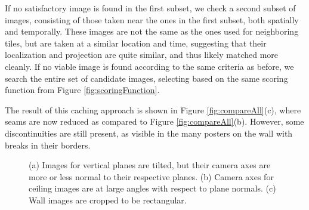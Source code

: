 \documentclass[]{spie}  %
\begin{document}
{If no satisfactory image is found in the first subset, we check a
second subset of images, consisting of those taken near the ones in
the first subset, both spatially and temporally. These images are not
the same as the ones used for neighboring tiles, but are taken at a
similar location and time, suggesting that their localization and
projection are quite similar, and thus likely matched more cleanly. If
no viable image is found according to the same criteria as before, we
search the entire set of candidate images, selecting based on the same
scoring function from Figure \ref{fig:scoringFunction}.

The result of this caching approach is shown in Figure
\ref{fig:compareAll}(c), where seams are now reduced as compared to
Figure \ref{fig:compareAll}(b). However, some discontinuities are
still present, as visible in the many posters on the wall with breaks
in their borders.

\begin{figure}
  \centering
  \centering
  \centering
  \caption{(a) Images for vertical planes are tilted, but their camera
    axes are more or less normal to their respective planes. (b)
    Camera axes for ceiling images are at large angles with respect to
    plane normals. (c) Wall images are cropped to be rectangular.}
  \label{fig:projectionAngles}
\end{figure}


}
\end{document}
